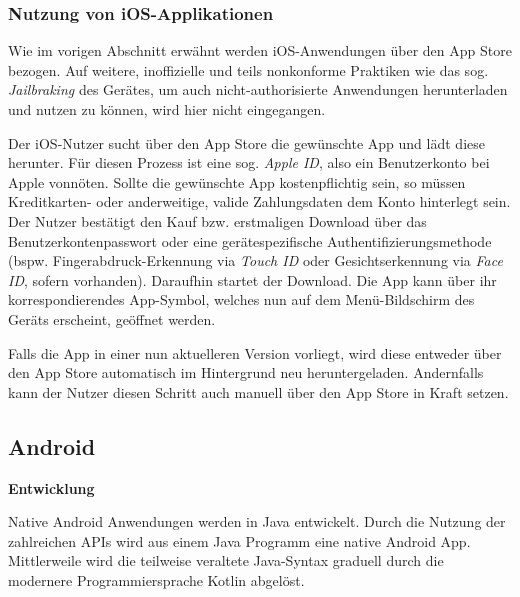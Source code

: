 \subsubsection{Nutzung von iOS-Applikationen}
Wie im vorigen Abschnitt erwähnt werden iOS-Anwendungen über den App Store bezogen. Auf weitere, inoffizielle und teils nonkonforme Praktiken wie das sog. \textit{Jailbraking} des Gerätes, um auch nicht-authorisierte Anwendungen herunterladen und nutzen zu können, wird hier nicht eingegangen.

Der iOS-Nutzer sucht über den App Store die gewünschte App und lädt diese herunter. Für diesen Prozess ist eine sog. \textit{Apple ID}, also ein Benutzerkonto bei Apple vonnöten. Sollte die gewünschte App kostenpflichtig sein, so müssen Kreditkarten- oder anderweitige, valide Zahlungsdaten dem Konto hinterlegt sein. Der Nutzer bestätigt den Kauf bzw. erstmaligen Download über das Benutzerkontenpasswort oder eine gerätespezifische Authentifizierungsmethode (bspw. Fingerabdruck-Erkennung via \textit{Touch ID} oder Gesichtserkennung via \textit{Face ID}, sofern vorhanden). Daraufhin startet der Download. Die App kann über ihr korrespondierendes App-Symbol, welches nun auf dem Menü-Bildschirm des Geräts erscheint, geöffnet werden.

Falls die App in einer nun aktuelleren Version vorliegt, wird diese entweder über den App Store automatisch im Hintergrund neu heruntergeladen. Andernfalls kann der Nutzer diesen Schritt auch manuell über den App Store in Kraft setzen.



\subsection{Android}

\textbf{Entwicklung}


Native Android Anwendungen werden in Java entwickelt. Durch die Nutzung der zahlreichen APIs wird aus einem Java Programm eine native Android App.
\cite[S. 1]{JavaForAndroid}
Mittlerweile wird die teilweise veraltete Java-Syntax graduell durch die modernere Programmiersprache Kotlin abgelöst.
\cite{KotlinAndroid}


